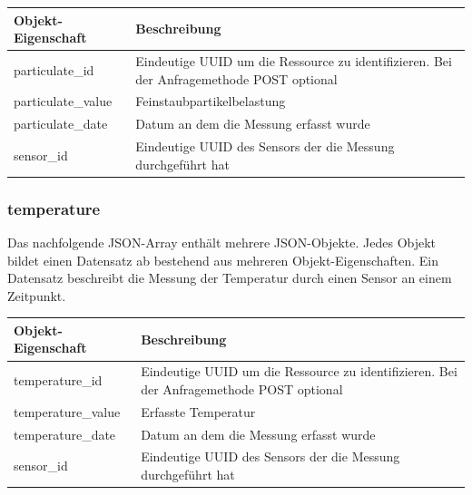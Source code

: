 \begin{table}[H]
  \begin{tabularx}{\textwidth}{lX}
    \textbf{Objekt-Eigenschaft} & \textbf{Beschreibung}                                                                     \\ \toprule
    particulate\_id             & Eindeutige UUID um die Ressource zu identifizieren. Bei der Anfragemethode POST optional  \\
    particulate\_value          & Feinstaubpartikelbelastung                                                                \\
    particulate\_date           & Datum an dem die Messung erfasst wurde                                                    \\
    sensor\_id                  & Eindeutige UUID des Sensors der die Messung durchgeführt hat                              \\
  \end{tabularx}
\end{table}

\subsubsection{temperature}%
\label{sec:rest.json.temperature}
Das nachfolgende JSON-Array enthält mehrere JSON-Objekte. Jedes Objekt bildet einen Datensatz ab bestehend aus mehreren Objekt-Eigenschaften. Ein Datensatz beschreibt die Messung der Temperatur durch einen Sensor an einem Zeitpunkt.

\begin{jsoncode}
\end{jsoncode}

\begin{table}[H]
  \begin{tabularx}{\textwidth}{lX}
    \textbf{Objekt-Eigenschaft} & \textbf{Beschreibung}                                                                     \\ \toprule
    temperature\_id             & Eindeutige UUID um die Ressource zu identifizieren. Bei der Anfragemethode POST optional  \\
    temperature\_value          & Erfasste Temperatur                                                                       \\
    temperature\_date           & Datum an dem die Messung erfasst wurde                                                    \\
    sensor\_id                  & Eindeutige UUID des Sensors der die Messung durchgeführt hat                              \\
  \end{tabularx}
\end{table}

